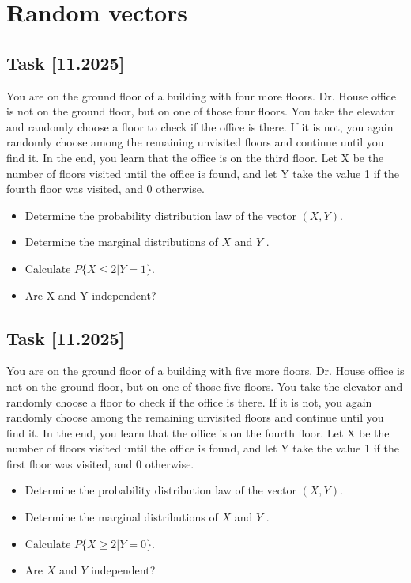 \documentclass[a4paper, 12pt]{article}
\begin{document}
\section*{Random vectors}



\subsection*{Task [11.2025]}
You are on the ground floor of a building with four more floors. Dr. House office is not on the ground
floor, but on one of those four floors. You take the elevator and randomly choose a floor to check if
the office is there. If it is not, you again randomly choose among the remaining unvisited floors and
continue until you find it. In the end, you learn that the office is on the third floor.
Let X be the number of floors visited until the office is found, and let Y take the value 1 if the fourth
floor was visited, and 0 otherwise.

\begin{itemize}
    \item [a)] Determine the probability distribution law of the vector $(X, Y )$.
    \item [b)] Determine the marginal distributions of $X$ and $Y$ .
    \item [c)] Calculate $P\{X \leq 2|Y = 1\}$.
    \item [d)] Are X and Y independent?

\end{itemize}

\subsection*{Task [11.2025]}
You are on the ground floor of a building with five more floors. Dr. House office is not on the ground
floor, but on one of those five floors. You take the elevator and randomly choose a floor to check if
the office is there. If it is not, you again randomly choose among the remaining unvisited floors and
continue until you find it. In the end, you learn that the office is on the fourth floor.
Let X be the number of floors visited until the office is found, and let Y take the value 1 if the first
floor was visited, and 0 otherwise.
\begin{itemize}
    \item [a)] Determine the probability distribution law of the vector $(X, Y )$.
\item [b)] Determine the marginal distributions of $X$ and $Y$ .
\item [c)] Calculate $P\{X \geq 2|Y = 0\}$.
\item [d)] Are $X$ and $Y$ independent?
\end{itemize}
\end{document}

